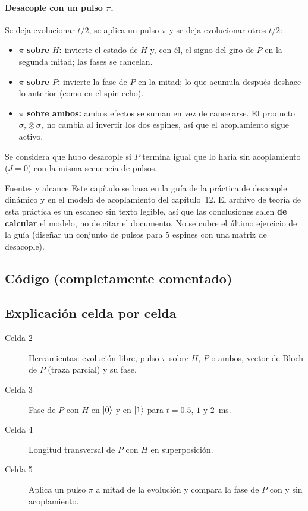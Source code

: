 \paragraph{Desacople con un pulso $\pi$.} Se deja evolucionar $t/2$, se aplica un
pulso $\pi$ y se deja evolucionar otros $t/2$:
\begin{itemize}
  \item \textbf{$\pi$ sobre $H$:} invierte el estado de $H$ y, con él, el signo
    del giro de $P$ en la segunda mitad; las fases se cancelan.
  \item \textbf{$\pi$ sobre $P$:} invierte la fase de $P$ en la mitad; lo que
    acumula después deshace lo anterior (como en el spin echo).
  \item \textbf{$\pi$ sobre ambos:} ambos efectos se suman en vez de cancelarse.
    El producto $\sigma_z\otimes\sigma_z$ no cambia al invertir los dos espines,
    así que el acoplamiento sigue activo.
\end{itemize}
Se considera que hubo desacople si $P$ termina igual que lo haría sin acoplamiento
($J=0$) con la misma secuencia de pulsos.

\begin{nota}{Fuentes y alcance}
Este capítulo se basa en la guía de la práctica de desacople dinámico y en el
modelo de acoplamiento del capítulo~12. El archivo de teoría de esta práctica es
un escaneo sin texto legible, así que las conclusiones salen \textbf{de calcular}
el modelo, no de citar el documento. No se cubre el último ejercicio de la
guía (diseñar un conjunto de pulsos para 5 espines con una matriz de
desacople).
\end{nota}

\subsection{Código (completamente comentado)}


\subsection{Explicación celda por celda}
\begin{description}
  \item[Celda 2] Herramientas: evolución libre, pulso $\pi$ sobre $H$, $P$ o
    ambos, vector de Bloch de $P$ (traza parcial) y su fase.
  \item[Celda 3] Fase de $P$ con $H$ en $\left|0\right\rangle$ y en $\left|1\right\rangle$ para $t=0.5$, $1$ y
    $2$~ms.
  \item[Celda 4] Longitud transversal de $P$ con $H$ en superposición.
  \item[Celda 5] Aplica un pulso $\pi$ a mitad de la evolución y compara la fase de $P$
    con y sin acoplamiento.
\end{description}

